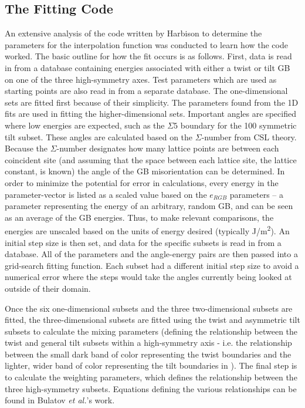 \documentclass[12pt]{report}
\begin{document}
\subsection{The Fitting Code}
An extensive analysis of the code written by Harbison\cite{harbison2015} to determine the parameters for the interpolation function was conducted to learn how the code worked.  The basic outline for how the fit occurs is as follows.  First, data is read in from a database containing energies associated with either a twist or tilt GB on one of the three high-symmetry axes.  Test parameters which are used as starting points are also read in from a separate database.  The one-dimensional sets are fitted first because of their simplicity.  The parameters found from the 1D fits are used in fitting the higher-dimensional sets.  Important angles are specified where low energies are expected, such as the $\Sigma5$ boundary for the \textlangle{}100\textrangle{} symmetric tilt subset.  These angles are calculated based on the $\Sigma$-number from CSL theory. Because the $\Sigma$-number designates how many lattice points  are between each coincident site (and assuming that the space between each lattice site, the lattice constant, is known) the angle of the GB misorientation can be determined.  In order to minimize the potential for error in calculations, every energy in the parameter-vector is listed as a scaled value based on the $e_{RGB}$ parameters -- a parameter representing the energy of an arbitrary, random GB, and can be seen as an average of the GB energies.  Thus, to make relevant comparisons, the energies are unscaled based on the units of energy desired (typically J/m\textsuperscript{2}).  An initial step size is then set, and data for the specific subsets is read in from a database.  All of the parameters and the angle-energy pairs are then passed into a grid-search fitting function.  Each subset had a different initial step size to avoid a numerical error where the steps would take the angles currently being looked at outside of their domain.

Once the six one-dimensional subsets and the three two-dimensional subsets are fitted, the three-dimensional subsets are fitted using the twist and asymmetric tilt subsets to calculate the mixing parameters (defining the relationship between the twist and general tilt subsets within a high-symmetry axis - i.e. the relationship between the small dark band of color representing the twist boundaries and the lighter, wider band of color representing the tilt boundaries in ).  The final step is to calculate the weighting parameters, which defines the relationship between the three high-symmetry subsets.  Equations defining the various relationships can be found in Bulatov \emph{et al.}'s work.
\end{document}
